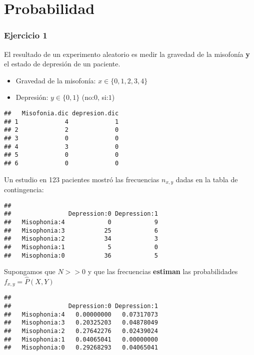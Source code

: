\documentclass[
]{book}
\providecommand{\tightlist}{%
  \setlength{\itemsep}{0pt}\setlength{\parskip}{0pt}}
\begin{document}
\hypertarget{probabilidad-3}{%
\section{Probabilidad}\label{probabilidad-3}}

\hypertarget{ejercicio-1-1}{%
\subsubsection{Ejercicio 1}\label{ejercicio-1-1}}

El resultado de un experimento aleatorio es medir la gravedad de la misofonía \textbf{y} el estado de depresión de un paciente.

\begin{itemize}
\tightlist
\item
  Gravedad de la misofonía: \(x\in \{0,1,2,3,4\}\)
\item
  Depresión: \(y\in \{0,1\}\) (no:\(0\), si:\(1\))
\end{itemize}

\begin{verbatim}
##   Misofonia.dic depresion.dic
## 1             4             1
## 2             2             0
## 3             0             0
## 4             3             0
## 5             0             0
## 6             0             0
\end{verbatim}

Un estudio en 123 pacientes mostró las frecuencias \(n_{x,y}\) dadas en la tabla de contingencia:

\begin{verbatim}
##               
##                Depression:0 Depression:1
##   Misophonia:4            0            9
##   Misophonia:3           25            6
##   Misophonia:2           34            3
##   Misophonia:1            5            0
##   Misophonia:0           36            5
\end{verbatim}

Supongamos que \(N>>0\) y que las frecuencias \textbf{estiman} las probabilidades \(f_{x,y}=\hat{P}(X, Y)\)

\begin{verbatim}
##               
##                Depression:0 Depression:1
##   Misophonia:4   0.00000000   0.07317073
##   Misophonia:3   0.20325203   0.04878049
##   Misophonia:2   0.27642276   0.02439024
##   Misophonia:1   0.04065041   0.00000000
##   Misophonia:0   0.29268293   0.04065041
\end{verbatim}
\end{document}
